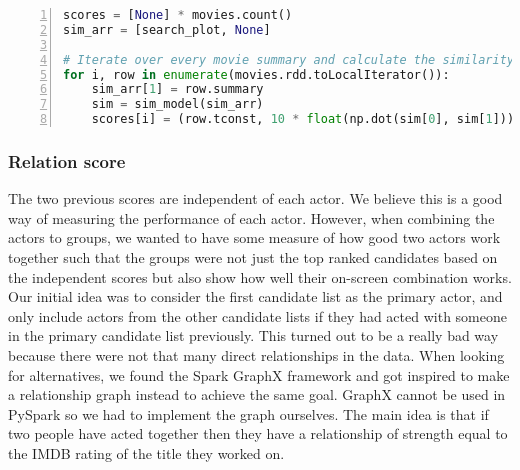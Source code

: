 \begin{lstlisting}[float=h, language=Python, caption=Plot similarity, label=CodeToLocalIterator, numbers=left]
scores = [None] * movies.count()
sim_arr = [search_plot, None]

# Iterate over every movie summary and calculate the similarity score
for i, row in enumerate(movies.rdd.toLocalIterator()):
    sim_arr[1] = row.summary
    sim = sim_model(sim_arr)
    scores[i] = (row.tconst, 10 * float(np.dot(sim[0], sim[1])))
\end{lstlisting}



\subsubsection{Relation score}

The two previous scores are independent of each actor. We believe this is a good way of measuring the performance of each actor. However, when combining the actors to groups, we wanted to have some measure of how good two actors work together such that the groups were not just the top ranked candidates based on the independent scores but also show how well their on-screen combination works. Our initial idea was to consider the first candidate list as the primary actor, and only include actors from the other candidate lists if they had acted with someone in the primary candidate list previously. This turned out to be a really bad way because there were not that many direct relationships in the data. When looking for alternatives, we found the Spark GraphX framework and got inspired to make a relationship graph instead to achieve the same goal. GraphX cannot be used in PySpark so we had to implement the graph ourselves. The main idea is that if two people have acted together then they have a relationship of strength equal to the IMDB rating of the title they worked on.

